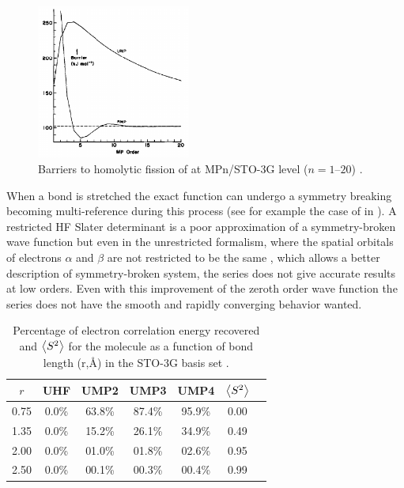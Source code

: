 \documentclass[11pt,a4paper]{article}
\begin{document}
\begin{figure}[h!]
    \centering
    \includegraphics[width=0.45\textwidth]{gill1986.png}
    \caption{\centering Barriers to homolytic fission of  at MPn/STO-3G level ($n = 1$--$20$) \cite{Gill_1986}.}
    \label{fig:RUMP_Gill}
\end{figure}

When a bond is stretched the exact function can undergo a symmetry breaking becoming multi-reference during this process (see for example the case of  in \cite{SzaboBook}). A restricted HF Slater determinant is a poor approximation of a symmetry-broken wave function but even in the unrestricted formalism, where the spatial orbitals of electrons $\alpha$ and $\beta$ are not restricted to be the same \cite{Fukutome_1981}, which allows a better description of symmetry-broken system, the series does not give accurate results at low orders. Even with this improvement of the zeroth order wave function the series does not have the smooth and rapidly converging behavior wanted. 

\begin{table}[h!]
    \centering
    \begin{tabular}{c c c c c c c}
\hline
 $r$ & UHF & UMP2 & UMP3 & UMP4 & $\expval{S^2}$ \\
\hline
0.75 & 0.0\% & 63.8\% & 87.4\% & 95.9\% & 0.00\\
1.35 & 0.0\% & 15.2\% & 26.1\% & 34.9\% & 0.49\\
2.00 & 0.0\% & 01.0\% & 01.8\% & 02.6\% & 0.95\\
2.50 & 0.0\% & 00.1\% & 00.3\% & 00.4\% & 0.99\\
\hline
\end{tabular}
    \caption{\centering Percentage of electron correlation energy recovered and $\expval{S^2}$ for the  molecule as a function of bond length (r,\si{\angstrom}) in the STO-3G basis set \cite{Gill_1988}.}
    \label{tab:SpinContamination}
\end{table}
\end{document}
